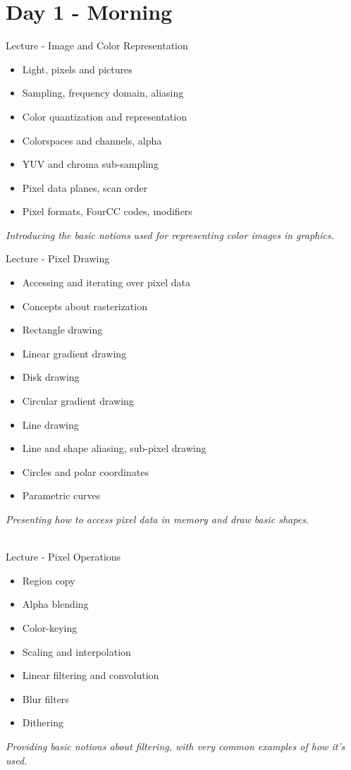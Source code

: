 \documentclass[a4paper,12pt,obeyspaces,spaces,hyphens]{article}
\begin{document}
\section{Day 1 - Morning}

\feagendatwocolumn
{Lecture - Image and Color Representation}
{
  \begin{itemize}
  \item Light, pixels and pictures
  \item Sampling, frequency domain, aliasing
  \item Color quantization and representation
  \item Colorspaces and channels, alpha
  \item YUV and chroma sub-sampling
  \item Pixel data planes, scan order
  \item Pixel formats, FourCC codes, modifiers
  \end{itemize}
  \vspace{0.5em}
  {\em Introducing the basic notions used for representing color images in graphics.}
}
{Lecture - Pixel Drawing}
{
  \begin{itemize}
  \item Accessing and iterating over pixel data
  \item Concepts about rasterization
  \item Rectangle drawing
  \item Linear gradient drawing
  \item Disk drawing
  \item Circular gradient drawing
  \item Line drawing
  \item Line and shape aliasing, sub-pixel drawing
  \item Circles and polar coordinates
  \item Parametric curves
  \end{itemize}
  \vspace{0.5em}
  {\em Presenting how to access pixel data in memory and draw basic shapes.}
}
\\
\feagendatwocolumn
{Lecture - Pixel Operations}
{
  \begin{itemize}
  \item Region copy
  \item Alpha blending
  \item Color-keying
  \item Scaling and interpolation
  \item Linear filtering and convolution
  \item Blur filters
  \item Dithering
  \end{itemize}
  \vspace{0.5em}
  {\em Providing basic notions about filtering, with very common examples of how it's used.}
}
\end{document}

